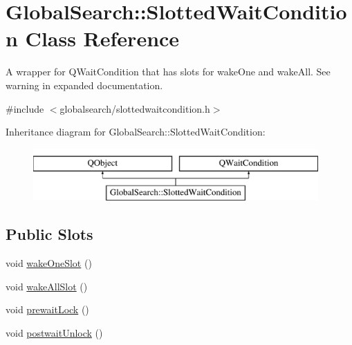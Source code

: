 \hypertarget{classGlobalSearch_1_1SlottedWaitCondition}{\section{Global\-Search\-:\-:Slotted\-Wait\-Condition Class Reference}
\label{classGlobalSearch_1_1SlottedWaitCondition}
}


A wrapper for Q\-Wait\-Condition that has slots for wake\-One and wake\-All. See warning in expanded documentation.  




{\ttfamily \#include $<$globalsearch/slottedwaitcondition.\-h$>$}

Inheritance diagram for Global\-Search\-:\-:Slotted\-Wait\-Condition\-:\begin{figure}[H]
\begin{center}
\leavevmode
\includegraphics[height=2.000000cm]{classGlobalSearch_1_1SlottedWaitCondition}
\end{center}
\end{figure}
\subsection*{Public Slots}
\begin{DoxyCompactItemize}
\item 
void \hyperlink{classGlobalSearch_1_1SlottedWaitCondition_a26b060dde9c49345da5fe1c8dbd3374c}{wake\-One\-Slot} ()
\item 
void \hyperlink{classGlobalSearch_1_1SlottedWaitCondition_a4024066fe5db52f2e2c9257fcfbb5320}{wake\-All\-Slot} ()
\item 
void \hyperlink{classGlobalSearch_1_1SlottedWaitCondition_afb1ba4315ffa2de59eaf5045d2a4c09f}{prewait\-Lock} ()
\item 
void \hyperlink{classGlobalSearch_1_1SlottedWaitCondition_a3c9f9e3ba7eebdc3cc270445385e334c}{postwait\-Unlock} ()
\end{DoxyCompactItemize}
